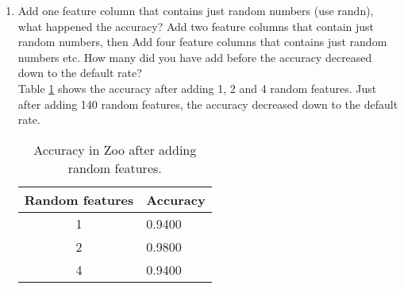 \documentclass[10pt]{scrartcl}
\begin{document}
\begin{enumerate}
 \item Add one feature column that contains just random numbers (use randn), what happened the accuracy?  Add two feature columns that contain just random numbers, then Add four feature columns that contains just random numbers etc. How many did you have add before the accuracy decreased down to the default rate? \\
 Table \ref{tab:acc2} shows the accuracy after adding 1, 2 and 4 random features.  Just after adding 140 random features, the accuracy decreased down to the default rate.
 \begin{table}[h!]
 \centering
 \begin{tabular}{cl}
  \toprule
  \textbf{Random features} & \textbf{Accuracy} \\
  \midrule
  1 & 0.9400 \\ 
  2 & 0.9800 \\
  4 & 0.9400 \\
  \bottomrule
 \end{tabular}
 \caption{Accuracy in Zoo after adding random features.}\label{tab:acc2}
 \end{table}
\end{enumerate}
\end{document}
